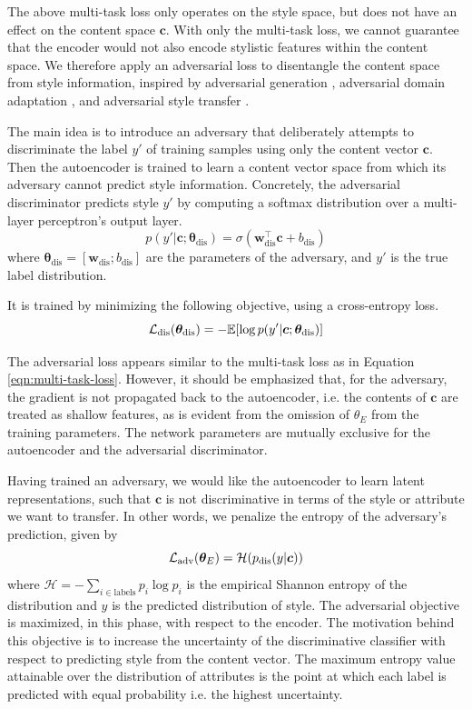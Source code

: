 The above multi-task loss only operates on the style space, but does not have an effect on the content space $\bm c$. With only the multi-task loss, we cannot guarantee that the encoder would not also encode stylistic features within the content space. We therefore apply an adversarial loss to disentangle the content space from style information, inspired by adversarial generation \citep{goodfellow2014generative}, adversarial domain adaptation \citep{liu2017adversarial}, and adversarial style transfer \citep{fu2017style}.

The main idea is to introduce an adversary that deliberately attempts to discriminate the label $y'$ of training samples using only the content vector $\bm c$. Then the autoencoder is trained to learn a content vector space from which its adversary cannot predict style information. Concretely, the adversarial discriminator predicts style $y'$ by computing a softmax distribution over a multi-layer perceptron's output layer.
\begin{equation}
	p(y' | \bm c; \bm\theta_\text{dis}) = \sigma(\bm w_\text{dis}^\top \bm c + b_\text{dis})
\end{equation}
where $\bm\theta_\text{dis}=[\bm w_\text{dis}; b_\text{dis}]$ are the parameters of the adversary, and $y'$ is the true label distribution.

It is trained by minimizing the following objective, using a cross-entropy loss.
\begin{equation} \label{eqn:adv-disc-loss}
	\mathcal{L}_\text{dis}(\bm\theta_\text{dis}) =
	- \mathbb{E} [\log p(y' | \bm c; \bm\theta_\text{dis})]
\end{equation}

The adversarial loss appears similar to the multi-task loss as in Equation \ref{eqn:multi-task-loss}. However, it should be emphasized that, for the adversary, the gradient is not propagated back to the autoencoder, i.e. the contents of $\bm c$ are treated as shallow features, as is evident from the omission of $\theta_{E}$ from the training parameters. The network parameters are mutually exclusive for the autoencoder and the adversarial discriminator.

Having trained an adversary, we would like the autoencoder to learn latent representations, such that $\bm c$ is not discriminative in terms of the style or attribute we want to transfer. In other words, we penalize the entropy of the adversary's prediction, given by
\begin{equation}
	\mathcal{L}_\text{adv}(\bm\theta_E) = \mathcal{H}(p_\text{dis}(y | \bm c))
\end{equation}
where $\mathcal{H}=-\sum_{i\in\text{labels}} p_i\log p_i$ is the empirical Shannon entropy of the distribution and $y$ is the predicted distribution of style. The adversarial objective is maximized, in this phase, with respect to the encoder. The motivation behind this objective is to increase the uncertainty of the discriminative classifier with respect to predicting style from the content vector. The maximum entropy value attainable over the distribution of attributes is the point at which each label is predicted with equal probability i.e. the highest uncertainty.


